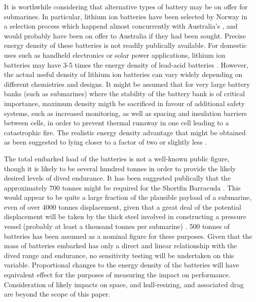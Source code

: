 \documentclass{article}\usepackage[]{graphicx}\usepackage[]{color}
\begin{document}
It is worthwhile considering that alternative types of battery may be on offer for submarines.  In particular, lithium ion batteries have been selected by Norway in a selection process which happend almost concurrently with Australia's \parencite{ohff201702}, and would probably have been on offer to Australia if they had been sought. Precise energy density of these batteries is not readily publically available.  For domestic uses such as handheld electronics or solar power applications, lithium ion batteries may have 3-5 times the energy density of lead-acid batteries \parencite{oconnor2017}.  However, the actual useful density of lithium ion batteries can vary widely depending on different chemistries and designs.  It might be assumed that for very large battery banks (such as submarines) where the stability of the battery bank is of critical importance, maximum density migth be sacrificed in favour of additional safety systems, such as increased monitoring, as well as spacing and insulation barriers between cells, in order to prevent thermal runaway in one cell leading to a catastrophic fire.  The realistic energy density advantage that might be obtained as been suggested to lying closer to a factor of two or slightly less \parencite{greenfield2016}.

The total embarked load of the batteries is not a well-known public figure, though it is likely to be several hundred tonnes in order to provide the likely desired levels of dived endurance.  It has been suggested publically that the approximately 700 tonnes might be required for the Shortfin Barracuda \parencite{ohff2017}.  This would appear to be quite a large fraction of the plausible payload of a submarine, even of over 4000 tonnes displacement, given that a great deal of the potential displacement will be taken by the thick steel involved in constructing a pressure vessel (probably at least a thousand tonnes per submarine) \parencite{jean2017}.  500 tonnes of batteries has been assumed as a nominal figure for these purposes.  Given that the mass of batteries embarked has only a direct and linear relationship with the dived range and endurance, no sensitivity testing will be undertaken on this variable.  Proportional changes to the energy density of the batteries will have equivalent effect for the purposes of measuring the impact on performance. Consideration of likely impacts on space, and hull-resizing, and associated drag are beyond the scope of this paper.
\end{document}
